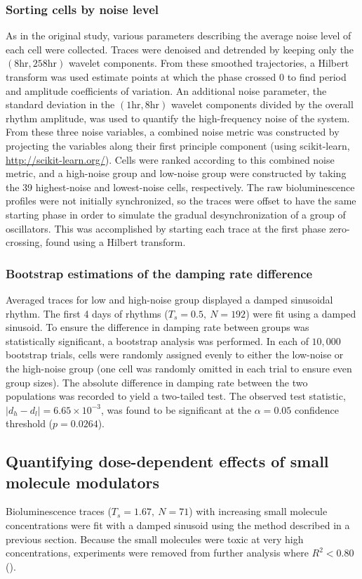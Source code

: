\subsubsection{Sorting cells by noise level}
As in the original study, various parameters describing the average noise level of each cell were collected.
Traces were denoised and detrended by keeping only the $(8 \text{hr}, 258 \text{hr})$ wavelet components.
From these smoothed trajectories, a Hilbert transform was used estimate points at which the phase crossed $0$ to find period and amplitude coefficients of variation.
An additional noise parameter, the standard deviation in the $(1 \text{hr}, 8 \text{hr})$ wavelet components divided by the overall rhythm amplitude, was used to quantify the high-frequency noise of the system.
From these three noise variables, a combined noise metric was constructed by projecting the variables along their first principle component (using scikit-learn, \url{http://scikit-learn.org/}).
Cells were ranked according to this combined noise metric, and a high-noise group and low-noise group were constructed by taking the 39 highest-noise and lowest-noise cells, respectively.
The raw bioluminescence profiles were not initially synchronized, so the traces were offset to have the same starting phase in order to simulate the gradual desynchronization of a group of oscillators. 
This was accomplished by starting each trace at the first phase zero-crossing, found using a Hilbert transform.

\subsubsection{Bootstrap estimations of the damping rate difference}
Averaged traces for low and high-noise group displayed a damped sinusoidal rhythm.
The first 4 days of rhythms ($T_s = 0.5,\ N = 192$) were fit using a damped sinusoid.
To ensure the difference in damping rate between groups was statistically significant, a bootstrap analysis was performed.
In each of $10,000$ bootstrap trials, cells were randomly assigned evenly to either the low-noise or the high-noise group (one cell was randomly omitted in each trial to ensure even group sizes).
The absolute difference in damping rate between the two populations was recorded to yield a two-tailed test.
The observed test statistic, $|d_h - d_l| = 6.65\times10^{-3}$, was found to be significant at the $\alpha = 0.05$ confidence threshold ($p = 0.0264$).

\subsection{Quantifying dose-dependent effects of small molecule modulators}
Bioluminescence traces ($T_s = 1.67,\ N=71$) with increasing small molecule concentrations were fit with a damped sinusoid using the method described in a previous section.
Because the small molecules were toxic at very high concentrations, experiments were removed from further analysis where $R^2 < 0.80$ ().

